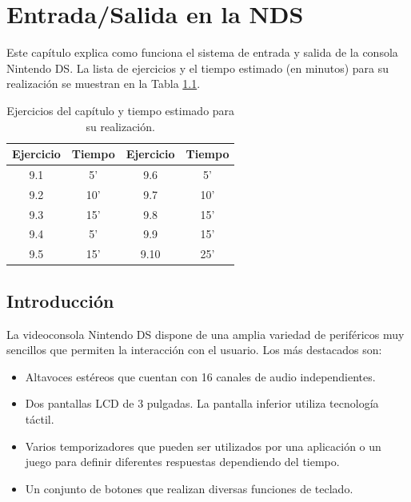 \chapter{Entrada/Salida en la NDS}

Este capítulo explica como funciona el sistema de entrada y salida de la consola Nintendo DS. La lista de ejercicios y el tiempo estimado (en minutos) para su realización se muestran en la Tabla \ref{c9_tab:ejercicios}.

\begin{table}[t]
	\centering
	\caption{Ejercicios del capítulo y tiempo estimado para su realización.}
	\begin{tabular}{|c|c||c|c|}
		\hline 
		Ejercicio & Tiempo & Ejercicio & Tiempo\\ 
		\hline 
		9.1 & 5'  & 9.6  & 5'  \\ 
		9.2 & 10' & 9.7  & 10' \\ 
		9.3 & 15' & 9.8  & 15' \\ 
		9.4 & 5'  & 9.9  & 15' \\ 
		9.5 & 15' & 9.10 & 25' \\ 
		\hline 
	\end{tabular} 
	\label{c9_tab:ejercicios}
\end{table}


\section{Introducción}
La videoconsola Nintendo DS dispone de una amplia variedad de periféricos muy sencillos que permiten la interacción con el usuario. Los más destacados son:

\begin{itemize}
	\item Altavoces estéreos que cuentan con 16 canales de audio independientes.
	\item Dos pantallas LCD  de 3 pulgadas. La pantalla inferior utiliza tecnología táctil.
	\item Varios temporizadores que  pueden ser utilizados por una aplicación o un juego para definir diferentes respuestas dependiendo del tiempo.
	\item Un conjunto de botones que realizan diversas funciones de teclado.
\end{itemize}

